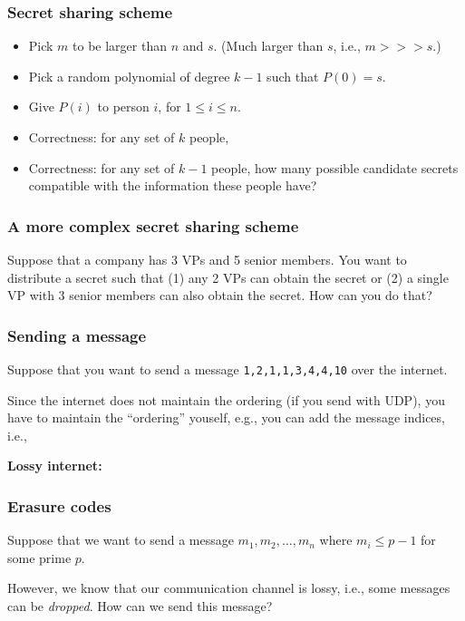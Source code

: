 \begin{frame}
  \frametitle{Secret sharing scheme}
  \pause
  \begin{itemize}
  \item Pick $m$ to be larger than $n$ and $s$. (Much larger than $s$,
    i.e., $m >>> s$.)
  \item Pick a random polynomial of degree $k-1$ such that $P(0)=s$.
  \item Give $P(i)$ to person $i$, for $1\leq i\leq n$.
  \item Correctness: for any set of $k$ people,
    \pause

  \item Correctness: for any set of $k-1$ people, how many possible
    candidate secrets compatible with the information these people
    have?
  \end{itemize}
\end{frame}

\begin{frame}
  \frametitle{A more complex secret sharing scheme}

  Suppose that a company has 3 VPs and 5 senior members.  You want to
  distribute a secret such that (1) any 2 VPs can obtain the secret or
  (2) a single VP with 3 senior members can also obtain the secret.
  How can you do that?
  
  \vspace{2.5in}
\end{frame}

\begin{frame}
  \frametitle{Sending a message}

  Suppose that you want to send a message {\tt 1,2,1,1,3,4,4,10} over
  the internet.

  \pause
  
  Since the internet does not maintain the ordering (if you send with
  UDP), you have to maintain the ``ordering'' youself, e.g., you can
  add the message indices, i.e.,
  \pause

  {\bf Lossy internet:}
  
  \vspace{1.5in}
\end{frame}

\begin{frame}
  \frametitle{Erasure codes}

  Suppose that we want to send a message $m_1,m_2,\ldots,m_n$ where
  $m_i\leq p-1$ for some prime $p$. 

  However, we know that our communication channel is lossy, i.e., some
  messages can be {\em dropped}.  How can we send this message?

  \vspace{2.5in}
\end{frame}
